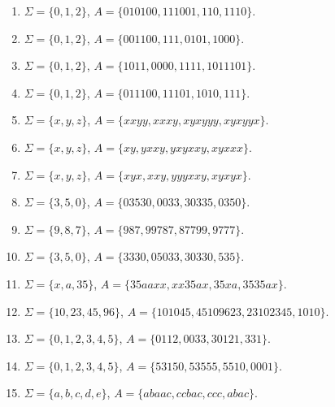 \begin{enumerate}
\item $\Sigma = \{0, 1, 2\}$, $A = \{010100, 111001, 110, 1110\}$.
\item $\Sigma = \{0, 1, 2\}$, $A = \{001100, 111, 0101, 1000\}$.
\item $\Sigma = \{0, 1, 2\}$, $A = \{1011, 0000, 1111, 1011101\}$.
\item $\Sigma = \{0, 1, 2\}$, $A = \{011100, 11101, 1010, 111\}$.
\item $\Sigma = \{x, y, z\}$, $A = \{xxyy, xxxy, xyxyyy, xyxyyx\}$.
\item $\Sigma = \{x, y, z\}$, $A = \{xy, yxxy, yxyxxy, xyxxx\}$.
\item $\Sigma = \{x, y, z\}$, $A = \{xyx, xxy, yyyxxy, xyxyx\}$.
\item $\Sigma = \{3, 5, 0\}$, $A = \{03530, 0033, 30335, 0350\}$.
\item $\Sigma = \{9, 8, 7\}$, $A = \{987, 99787, 87799, 9777\}$.
\item $\Sigma = \{3, 5, 0\}$, $A = \{3330, 05033, 30330, 535\}$.
\item $\Sigma = \{x, a, 35\}$, $A = \{35aaxx, xx35ax, 35xa, 3535ax\}$.
\item $\Sigma = \{10, 23, 45, 96\}$, $A = \{101045, 45109623, 23102345, 1010\}$.
\item $\Sigma = \{0, 1, 2, 3, 4, 5\}$, $A = \{0112, 0033, 30121, 331\}$.
\item $\Sigma = \{0, 1, 2, 3, 4, 5\}$, $A = \{53150, 53555, 5510, 0001\}$.
\item $\Sigma = \{a, b, c, d, e\}$, $A = \{abaac, ccbac, ccc, abac\}$.
\end{enumerate}

\bigskip

